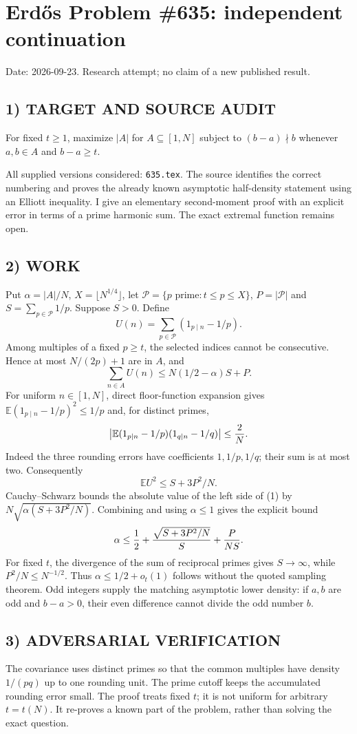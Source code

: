 \section{Erd\H{o}s Problem \#635: independent continuation}
\noindent Date: 2026-09-23. Research attempt; no claim of a new published result.
\subsection{1) TARGET AND SOURCE AUDIT}
For fixed $t\ge1$, maximize $|A|$ for $A\subseteq[1,N]$ subject to $(b-a)\nmid b$ whenever $a,b\in A$ and $b-a\ge t$.

All supplied versions considered: \texttt{635.tex}.
The source identifies the correct numbering and proves the already known asymptotic half-density statement using an Elliott inequality. I give an elementary second-moment proof with an explicit error in terms of a prime harmonic sum. The exact extremal function remains open.
\subsection{2) WORK}
Put $\alpha=|A|/N$, $X=\lfloor N^{1/4}\rfloor$, let $\mathcal P=\{p\text{ prime}:t\le p\le X\}$, $P=|\mathcal P|$ and $S=\sum_{p\in\mathcal P}1/p$. Suppose $S>0$. Define
\[
U(n)=\sum_{p\in\mathcal P}(1_{p\mid n}-1/p).
\]
Among multiples of a fixed $p\ge t$, the selected indices cannot be consecutive. Hence at most $N/(2p)+1$ are in $A$, and
\[
\sum_{n\in A}U(n)\le N(1/2-\alpha)S+P. \tag{1}
\]
For uniform $n\in[1,N]$, direct floor-function expansion gives
$\mathbb E(1_{p\mid n}-1/p)^2\le1/p$ and, for distinct primes,
\[
\left|\mathbb E(1_{p\mid n}-1/p)(1_{q\mid n}-1/q)\right|\le {2\over N}.
\]
Indeed the three rounding errors have coefficients $1,1/p,1/q$; their sum is at most two. Consequently
\[
\mathbb E U^2\le S+3P^2/N.
\]
Cauchy--Schwarz bounds the absolute value of the left side of (1) by $N\sqrt{\alpha(S+3P^2/N)}$. Combining and using $\alpha\le1$ gives the explicit bound
\[
\alpha\le {1\over2}+{\sqrt{S+3P^2/N}\over S}+{P\over NS}.
\]
For fixed $t$, the divergence of the sum of reciprocal primes gives $S\to\infty$, while $P^2/N\le N^{-1/2}$. Thus $\alpha\le1/2+o_t(1)$ follows without the quoted sampling theorem. Odd integers supply the matching asymptotic lower density: if $a,b$ are odd and $b-a>0$, their even difference cannot divide the odd number $b$.
\subsection{3) ADVERSARIAL VERIFICATION}
The covariance uses distinct primes so that the common multiples have density $1/(pq)$ up to one rounding unit. The prime cutoff keeps the accumulated rounding error small. The proof treats fixed $t$; it is not uniform for arbitrary $t=t(N)$. It re-proves a known part of the problem, rather than solving the exact question.
